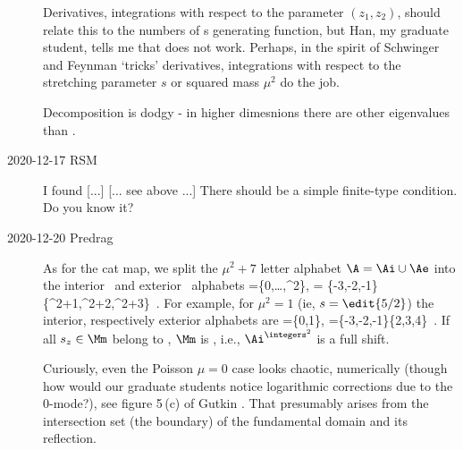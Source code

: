 \begin{description}
Derivatives, integrations with respect to the parameter $(z_1,z_2)$,
should relate this to the numbers of {\lattstate}s generating
function, but Han, my graduate student, tells me that does not work.
Perhaps, in the spirit of Schwinger and Feynman `tricks'
derivatives, integrations with respect to the stretching parameter ${s}$
or squared mass $\mu^2$ do the job.

Decomposition  is dodgy - in higher dimesnions there
are other eigenvalues than .

\item[2020-12-17 RSM]
I found [...] \PV{} [... see above ...]
There should be a simple finite-type condition. Do you know it?

\item[2020-12-20 Predrag]                               \toCB
As for the {cat map}, we split the ${\mu}^2+7$ letter alphabet $\A=\Ai\cup\Ae$
into the interior \Ai\ and exterior \Ae\ alphabets
\beq
  \Ai=\{0,\dots,{\mu}^2\},   \quad
  \Ae=
\{-{3},-{2},-{1}\}\cup
\{{\mu}^2+1,{\mu}^2+2,{\mu}^2+3\}
\,.
For example, for ${\mu}^2=1$ (ie, $s=\edit{5/2}$) the interior,
respectively exterior alphabets are
\beq
  \Ai=\{0,1\},   \quad
  \Ae=\{-{3},-{2},-{1}\}\cup \{2,3,4\}
\,.
If all $\Ssym{z}\in \Mm$ belong to \Ai, $\Mm$ is
{\admissible}, i.e., $\Ai^{\integers^2}$ is a full shift.

Curiously, even the Poisson ${\mu}=0$  case looks chaotic, numerically
(though how would our graduate students notice logarithmic corrections
due to the 0-mode?), see
{figure 5\,(c)} of Gutkin \etal{}.
That presumably arises from the intersection set (the boundary)
of the  fundamental domain and its reflection.








\end{description}

\renewcommand{\ssp}{x}
\renewcommand{\Ssym}[1]{{\ensuremath{s_{#1}}}}    %
\printbibliography[heading=subbibintoc,title={References}]
